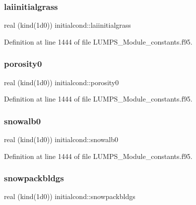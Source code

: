 \subsubsection{\texorpdfstring{laiinitialgrass}{laiinitialgrass}}
{\footnotesize\ttfamily real (kind(1d0)) initialcond\+::laiinitialgrass}



Definition at line 1444 of file L\+U\+M\+P\+S\+\_\+\+Module\+\_\+constants.\+f95.

\mbox{\label{namespaceinitialcond_a9c4cad07b3a26a8a84712c2e39ec57d1}} 
\subsubsection{\texorpdfstring{porosity0}{porosity0}}
{\footnotesize\ttfamily real (kind(1d0)) initialcond\+::porosity0}



Definition at line 1444 of file L\+U\+M\+P\+S\+\_\+\+Module\+\_\+constants.\+f95.

\mbox{\label{namespaceinitialcond_a645991fe3858b2fa2ecc195ca83e624c}} 
\subsubsection{\texorpdfstring{snowalb0}{snowalb0}}
{\footnotesize\ttfamily real (kind(1d0)) initialcond\+::snowalb0}



Definition at line 1444 of file L\+U\+M\+P\+S\+\_\+\+Module\+\_\+constants.\+f95.

\mbox{\label{namespaceinitialcond_a9a868a739685083b0593be6dbe85a45e}} 
\subsubsection{\texorpdfstring{snowpackbldgs}{snowpackbldgs}}
{\footnotesize\ttfamily real (kind(1d0)) initialcond\+::snowpackbldgs}



